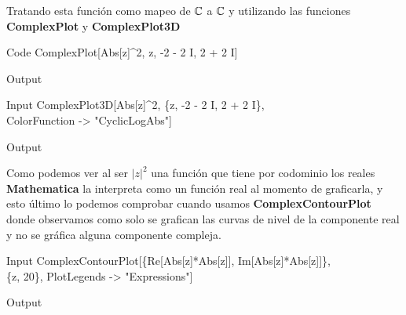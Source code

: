 Tratando esta función como mapeo de $\mathbb{C}$ a $\mathbb{C}$ y utilizando las funciones \textbf{ComplexPlot} y \textbf{ComplexPlot3D}

\begin{mmaCell}[functionlocal=y]{Code}
	 ComplexPlot[Abs[z]^2, {z, -2 - 2 I, 2 + 2 I}]
\end{mmaCell}

\begin{mmaCell}[moregraphics={moreig={scale=.35}}]{Output}
\end{mmaCell}

\begin{mmaCell}{Input}
  ComplexPlot3D[Abs[z]^2, \{z, -2 - 2 I, 2 + 2 I\},\\ColorFunction -> "CyclicLogAbs"]
\end{mmaCell}

\begin{mmaCell}[moregraphics={moreig={scale=.4}}]{Output}
\end{mmaCell}
Como podemos ver al ser $|z|^2$ una función que tiene por codominio los reales \textbf{Mathematica} la interpreta como un función real al momento de graficarla, y esto último lo podemos comprobar cuando usamos \textbf{ComplexContourPlot} donde observamos como solo se grafican las curvas de nivel de la componente real y no se gráfica alguna componente compleja.
\begin{mmaCell}{Input}
	 ComplexContourPlot[\{Re[Abs[z]*Abs[z]], Im[Abs[z]*Abs[z]]\},\\\{z, 20\}, PlotLegends -> "Expressions"]
\end{mmaCell}

\begin{mmaCell}[moregraphics={moreig={scale=.35}}]{Output}
\end{mmaCell}


